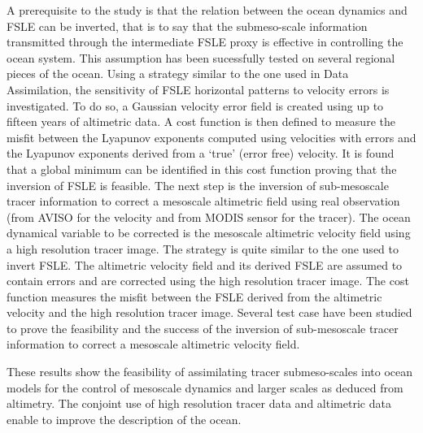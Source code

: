 A prerequisite to the study is that the relation between the ocean dynamics and FSLE can be inverted, that is to say that the submeso-scale information transmitted through the intermediate FSLE proxy is effective in controlling the ocean system. 
This assumption has been sucessfully tested on several regional pieces of the ocean.
Using a strategy similar to the one used in Data Assimilation, the sensitivity of FSLE horizontal patterns to velocity errors is investigated. 
To do so, a Gaussian velocity error field is created using up to fifteen years of altimetric data. 
A cost function is then defined to measure the misfit between the Lyapunov exponents computed using velocities with errors and the Lyapunov exponents derived from a `true' (error free) velocity. 
It is found that a global minimum can be identified in this cost function proving that the inversion of FSLE is feasible. 
The next step is the inversion of sub-mesoscale tracer information to correct a mesoscale altimetric field using real observation (from AVISO for the velocity and from MODIS sensor for the tracer). 
The ocean dynamical variable to be corrected is the mesoscale altimetric velocity field using a high resolution tracer image. 
The strategy is quite similar to the one used to invert FSLE. The altimetric velocity field and its derived FSLE are assumed to contain errors and are corrected using the high resolution tracer image. 
The cost function measures the misfit between the FSLE derived from the altimetric velocity and 
the high resolution tracer image. 
Several test case have been studied to prove the feasibility and the success of the inversion of sub-mesoscale tracer information to correct a mesoscale altimetric velocity field.

These results show the feasibility of assimilating tracer submeso-scales into ocean models for the control of mesoscale dynamics and larger scales as deduced from altimetry.
The conjoint use of high resolution tracer data and altimetric data enable to improve the description of the ocean.

